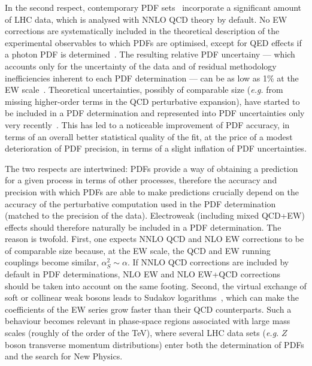 In the second respect, contemporary PDF
sets~\cite{Harland-Lang:2014zoa,Ball:2017nwa,Hou:2019efy}
incorporate a significant amount of LHC data, which is analysed with NNLO QCD 
theory by default. No EW corrections are systematically included in the 
theoretical description of the experimental observables to which PDFs are 
optimised, except for QED effects if a photon PDF is 
determined~\cite{Schmidt:2015zda,Bertone:2017bme,Harland-Lang:2019pla}. 
The resulting relative PDF uncertainy --- which accounts only for the 
uncertainty of the data and of residual methodology inefficiencies inherent to 
each PDF determination --- can be as low as 1\% at the EW 
scale~\cite{Ball:2017nwa}. Theoretical uncertainties, possibly of comparable 
size ({\it e.g.} from missing higher-order terms in the QCD perturbative 
expansion), have started to be included in a PDF determination and represented 
into PDF uncertainties only very 
recently~\cite{AbdulKhalek:2019bux,AbdulKhalek:2019ihb}. This has led to a 
noticeable improvement of PDF accuracy, in terms of an overall
better statistical quality of the fit, at the price of a modest deterioration 
of PDF precision, in terms of a slight inflation of PDF uncertainties.

The two respects are intertwined: PDFs provide a way of obtaining a prediction
for a given process in terms of other processes, therefore the accuracy and 
precision with which PDFs are able to make predictions crucially depend on 
the accuracy of the perturbative computation used in the PDF determination
(matched to the precision of the data). Electroweak (including mixed QCD+EW) 
effects should therefore naturally be included in a PDF determination. The 
reason is twofold. First, one expects NNLO QCD and NLO EW corrections to be of 
comparable size because, at the EW scale, the QCD and EW running couplings 
become similar, $\alpha_S^2\sim \alpha$. If NNLO QCD corrections are included 
by default in PDF determinations, NLO EW and NLO EW+QCD corrections should be 
taken into account on the same footing. Second, the virtual exchange of soft or 
collinear weak bosons leads to Sudakov 
logarithms~\cite{Denner:2000jv,Denner:2001gw},
which can make the coefficients of the EW series grow faster than 
their QCD counterparts. Such a behaviour becomes relevant in
phase-space regions associated with large mass scales (roughly of the order
of the TeV), where several LHC data sets ({\it e.g.} $Z$ boson transverse 
momentum distributions) enter both the determination of PDFs and the search
for New Physics.

